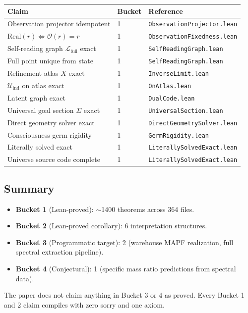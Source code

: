 \begin{center}
\small
\begin{tabular}{@{}lll@{}}
\hline
\textbf{Claim} & \textbf{Bucket} & \textbf{Reference} \\
\hline
Observation projector idempotent & 1 & \texttt{ObservationProjector.lean} \\
$\mathrm{Real}(r) \iff \mathcal{O}(r) = r$ & 1 & \texttt{ObservationFixedness.lean} \\
Self-reading graph $\mathcal{L}_{\mathrm{full}}$ exact & 1 & \texttt{SelfReadingGraph.lean} \\
Full point unique from state & 1 & \texttt{SelfReadingGraph.lean} \\
Refinement atlas $X$ exact & 1 & \texttt{InverseLimit.lean} \\
$\mathcal{U}_{\mathrm{ind}}$ on atlas exact & 1 & \texttt{OnAtlas.lean} \\
Latent graph exact & 1 & \texttt{DualCode.lean} \\
Universal goal section $\Sigma$ exact & 1 & \texttt{UniversalSection.lean} \\
Direct geometry solver exact & 1 & \texttt{DirectGeometrySolver.lean} \\
Consciousness germ rigidity & 1 & \texttt{GermRigidity.lean} \\
Literally solved exact & 1 & \texttt{LiterallySolvedExact.lean} \\
Universe source code complete & 1 & \texttt{LiterallySolvedExact.lean} \\
\hline
\end{tabular}
\end{center}

\subsection*{Summary}

\begin{itemize}
\item \textbf{Bucket 1} (Lean-proved): $\sim$1400 theorems across 364 files.
\item \textbf{Bucket 2} (Lean-proved corollary): 6 interpretation structures.
\item \textbf{Bucket 3} (Programmatic target): 2 (warehouse MAPF realization, full spectral extraction pipeline).
\item \textbf{Bucket 4} (Conjectural): 1 (specific mass ratio predictions from spectral data).
\end{itemize}

The paper does not claim anything in Bucket 3 or 4 as proved.
Every Bucket 1 and 2 claim compiles with zero sorry and one axiom.
